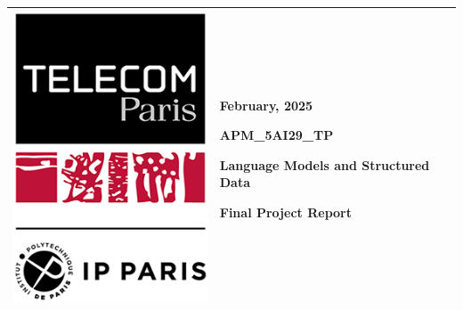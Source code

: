 \documentclass[12pt,a4paper]{article}
\begin{document}
\begin{center}
    \begin{tabular}{|p{}|p{}|}
        \hline
        {
            \vspace{0cm} %
            \centerline{\includegraphics[width=\linewidth]{./images/tp-ipp}}
        }
         & {
                \vspace{0cm} %
                \centering
                \large
                {\hfill February, 2025}

                \vspace*{.5cm}
                \textbf{APM\_5AI29\_TP}

                \vspace*{.5cm}
                \setstretch{1.5}
                {\Large\textbf{Language Models and Structured Data}}

                \vspace*{.5cm}
                Final Project Report

                \vspace*{1cm}
        }    \\
        \hline
    \end{tabular}
\end{center}
\end{document}
